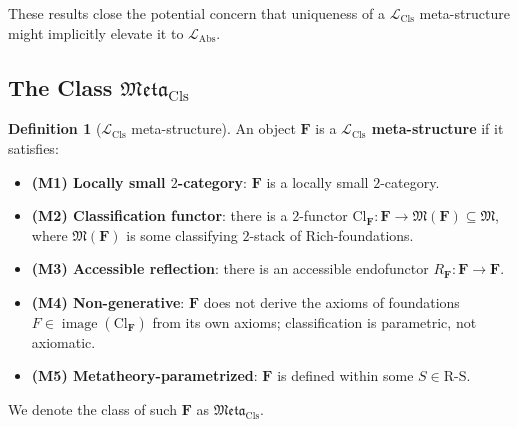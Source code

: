 \documentclass[11pt]{article}
\theoremstyle{plain}
\theoremstyle{definition}
\newtheorem{definition}[theorem]{Definition}
\newcommand{\RS}{\mathrm{R\text{-}S}}
\newcommand{\fM}{\mathfrak{M}}
\newcommand{\Meta}{\mathfrak{Meta}}
\newcommand{\LCls}{\mathcal{L}_{\mathrm{Cls}}}
\newcommand{\LAbs}{\mathcal{L}_{\mathrm{Abs}}}
\newcommand{\Cl}{\mathrm{Cl}}
\DeclareMathOperator{\image}{image}
\begin{document}
These results close the potential concern that uniqueness of a $\LCls$ meta-structure might implicitly elevate it to $\LAbs$.

\subsection{\texorpdfstring{The Class $\Meta_{\mathrm{Cls}}$}{The Class Meta\_5+}}

\begin{definition}[$\LCls$ meta-structure]\label{def:meta}
An object $\mathbf{F}$ is a \textbf{$\LCls$ meta-structure} if it satisfies:
\begin{itemize}
\item \textbf{(M1) Locally small $2$-category}: $\mathbf{F}$ is a locally small $2$-category.
\item \textbf{(M2) Classification functor}: there is a $2$-functor $\Cl_{\mathbf{F}} : \mathbf{F} \to \fM(\mathbf{F}) \subseteq \fM$, where $\fM(\mathbf{F})$ is some classifying $2$-stack of Rich-foundations.
\item \textbf{(M3) Accessible reflection}: there is an accessible endofunctor $R_{\mathbf{F}} : \mathbf{F} \to \mathbf{F}$.
\item \textbf{(M4) Non-generative}: $\mathbf{F}$ does not derive the axioms of foundations $F \in \image(\Cl_{\mathbf{F}})$ from its own axioms; classification is parametric, not axiomatic.
\item \textbf{(M5) Metatheory-parametrized}: $\mathbf{F}$ is defined within some $S \in \RS$.
\end{itemize}
We denote the class of such $\mathbf{F}$ as $\Meta_{\mathrm{Cls}}$.
\end{definition}
\end{document}
